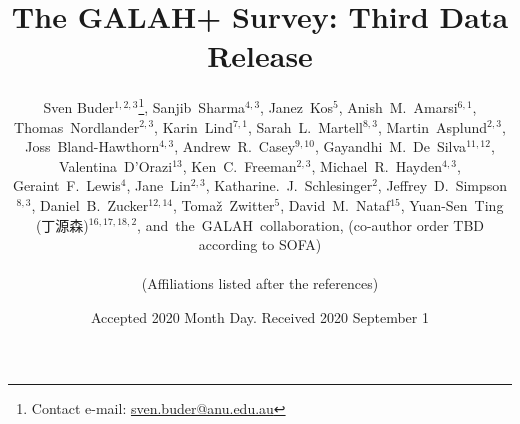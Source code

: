 \documentclass[fleqn,usenatbib,useAMS]{mnras}
\begin{document}
\begin{CJK*}{UTF8}{gbsn}
\label{firstpage}
\pagerange{\pageref{firstpage}--\pageref{lastpage}}


\title{The GALAH+ Survey: Third Data Release}

\author[Buder et al.]{Sven Buder$^{1,2,3}$\thanks{Contact e-mail: \href{mailto:sven.buder@anu.edu.au}{sven.buder@anu.edu.au}},
Sanjib~Sharma$^{4,3}$, 
Janez~Kos$^{5}$,
Anish~M.~Amarsi$^{6,1}$, \newauthor
Thomas~Nordlander$^{2,3}$, 
Karin~Lind$^{7,1}$,
Sarah~L.~Martell$^{8,3}$, 
Martin~Asplund$^{2,3}$, \newauthor 
Joss~Bland-Hawthorn$^{4,3}$,
Andrew~R.~Casey$^{9,10}$, 
Gayandhi~M.~De~Silva$^{11,12}$, \newauthor
Valentina~{D'Orazi}$^{13}$,
Ken~C.~Freeman$^{2,3}$,  
Michael~R.~Hayden$^{4,3}$,
Geraint~F.~Lewis$^{4}$,   \newauthor
Jane~Lin$^{2,3}$, 
Katharine.~J.~Schlesinger$^{2}$,
Jeffrey~D.~Simpson$^{8,3}$, 
Daniel~B.~Zucker$^{12,14}$, \newauthor
Toma\v{z}~Zwitter$^{5}$,  
David~M.~Nataf$^{15}$,
Yuan-Sen~Ting (丁源森)$^{16,17,18,2}$,  \newauthor
and~the~GALAH~collaboration, 
(co-author order TBD according to SOFA)
\\
\\
(Affiliations listed after the references)}

\date{Accepted 2020 Month Day. Received 2020 September 1}


\maketitle
\end{CJK*}
\end{document}
